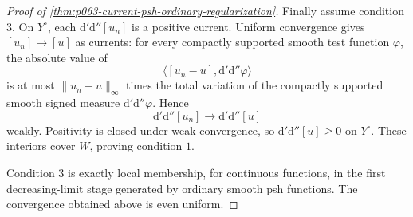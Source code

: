 \begin{proof}[Proof of
\cref{thm:p063-current-psh-ordinary-regularization}]
Finally assume condition \(3\).  On \(Y^\circ\), each
\(\mathrm d'\mathrm d''[u_n]\) is a positive current.  Uniform convergence
gives \([u_n]\to[u]\) as currents: for every compactly supported smooth
test function \(\varphi\), the absolute value of
\[
 \bigl\langle [u_n-u],\mathrm d'\mathrm d''\varphi\bigr\rangle
\]
is at most \(\lVert u_n-u\rVert_\infty\) times the total variation of the
compactly supported smooth signed measure
\(\mathrm d'\mathrm d''\varphi\).  Hence
\[
                    \mathrm d'\mathrm d''[u_n]
                    \longrightarrow
                    \mathrm d'\mathrm d''[u]
\]
weakly.  Positivity is closed under weak convergence, so
\(\mathrm d'\mathrm d''[u]\geq0\) on \(Y^\circ\).  These interiors cover
\(W\), proving condition \(1\).

Condition \(3\) is exactly local membership, for continuous functions, in
the first decreasing-limit stage generated by ordinary smooth psh
functions.  The convergence obtained above is even uniform.
\end{proof}
